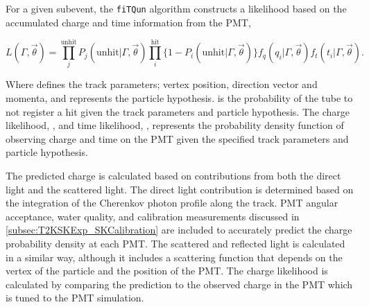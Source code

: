 For a given subevent, the \texttt{fiTQun} algorithm constructs a likelihood based on the accumulated charge  and time information  from the  PMT,

\begin{equation}
  L(\Gamma, \vec{\theta}) = \prod^{\text{unhit}}_{j} P_{j}(\text{unhit}|\Gamma,\vec{\theta}) \prod^{\text{hit}}_{i} \{ 1 - P_{i}(\text{unhit}|\Gamma,\vec{\theta}) \}   f_{q}(q_{i} | \Gamma, \vec{\theta}) f_{t}(t_{i} | \Gamma, \vec{\theta}).
\end{equation}

Where \quickmath{\vec{\theta}} defines the track parameters; vertex position, direction vector and momenta, and \quickmath{\Gamma} represents the particle hypothesis.  is the probability of the  tube to not register a hit given the track parameters and particle hypothesis. The charge likelihood, , and time likelihood, , represents the probability density function of observing charge  and time  on the  PMT given the specified track parameters and particle hypothesis.


The predicted charge is calculated based on contributions from both the direct light and the scattered light. The direct light contribution is determined based on the integration of the Cherenkov photon profile along the track. PMT angular acceptance, water quality, and calibration measurements discussed in \autoref{subsec:T2KSKExp_SKCalibration} are included to accurately predict the charge probability density at each PMT. The scattered and reflected light is calculated in a similar way, although it includes a scattering function that depends on the vertex of the particle and the position of the PMT. The charge likelihood is calculated by comparing the prediction to the observed charge in the PMT which is tuned to the PMT simulation.

